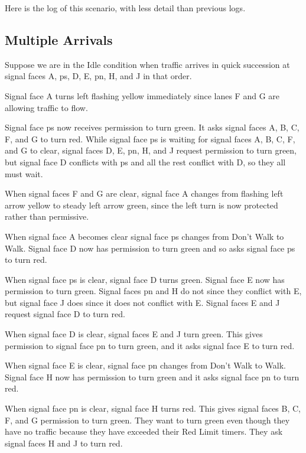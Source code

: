 \documentclass[letterpaper,twoside]{article}
\begin{document}
Here is the log of this scenario, with less detail than previous
logs.



\subsection{Multiple Arrivals}

Suppose we are in the Idle condition when traffic arrives in quick succession
at signal faces A, ps, D, E, pn, H, and J in that order.

Signal face A turns left flashing yellow immediately since lanes
F and G are allowing traffic to flow.

Signal face ps now receives permission to turn green.  It asks
signal faces A, B, C, F, and G to turn red.
While signal face ps is waiting for signal faces A, B, C, F, and G to clear,
signal faces D, E, pn, H, and J request permission to turn green, but
signal face D conflicts with ps and all the rest conflict
with D, so they all must wait.

When signal faces F and G are clear, signal face A changes from flashing
left arrow yellow to steady left arrow green, since the left turn is now
protected rather than permissive.

When signal face A becomes clear signal face ps changes from Don't Walk
to Walk.  Signal face D now has permission to turn green and so asks
signal face ps to turn red.

When signal face ps is clear, signal face D turns green.  Signal face E
now has permission to turn green.  Signal faces pn and H do not since they
conflict with E, but signal face J does since it does
not conflict with E.  Signal faces E and J request signal face D to
turn red.

When signal face D is clear, signal faces E and J turn green.  This
gives permission to signal face pn to turn green, and it asks signal face
E to turn red.

When signal face E is clear, signal face pn changes from Don't Walk to
Walk.  Signal face H now has permission to turn green and it asks
signal face pn to turn red.

When signal face pn is clear, signal face H turns red.  This gives
signal faces B, C, F, and G permission to turn green.  They want to
turn green even though they have no traffic because they have
exceeded their Red Limit timers.  They ask signal faces H and J
to turn red.
\end{document}
